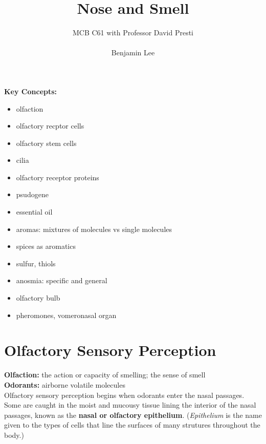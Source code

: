 \documentclass{article}
\title{Nose and Smell}
\author{MCB C61 with Professor David Presti \\ \\ Benjamin Lee}
\begin{document}
\maketitle

\textbf{Key Concepts:}
\begin{itemize}
    \item olfaction
    \item olfactory recptor cells
    \item olfactory stem cells
    \item cilia
    \item olfactory receptor proteins
    \item psudogene
    \item essential oil
    \item aromas: mixtures of molecules vs single molecules
    \item spices as aromatics
    \item sulfur, thiols
    \item anosmia: specific and general
    \item olfactory bulb
    \item pheromones, vomeronasal organ
\end{itemize}

\newpage

\section{Olfactory Sensory Perception}

\textbf{Olfaction:} the action or capacity of smelling; the sense of smell \\
\textbf{Odorants:} airborne volatile molecules \\

Olfactory sensory perception begins when odorants enter the nasal passages. Some are caught in the moist and mucousy tissue lining the interior of the nasal passages, known as the \textbf{nasal or olfactory epithelium}. (\textit{Epithelium} is the name given to the types of cells that line the surfaces of many strutures throughout the body.)\\ 
\end{document}
